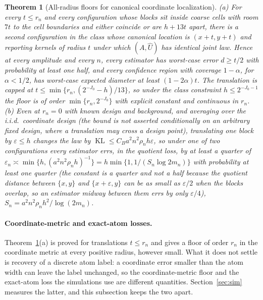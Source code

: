 \documentclass[11pt]{article}
\newtheorem{theorem}{Theorem}[section]
\theoremstyle{definition}
\newcommand{\1}{\mathbf 1}\newcommand{\op}{\operatorname}
\begin{document}
\begin{theorem}[All-radius floors for canonical coordinate localization]
\label{thm:floor}
\textup{(a)} For every $t\le r_n$ and every configuration whose blocks sit
inside coarse cells with room $7t$ to the cell boundaries and either coincide or
are $h+13t$ apart, there is a second configuration in the class whose canonical
location is $(x+t,y+t)$ and reporting kernels of radius $t$ under which
$(A,\widehat U)$ has \emph{identical} joint law.  Hence at every amplitude and
every $n$, every estimator has worst-case error $d\ge t/2$ with probability at
least one half, and every confidence region with coverage $1-\alpha$, for $\alpha<1/2$, has
worst-case expected diameter at least $(1-2\alpha)t$.  The translation is capped at $t\le\min\{r_n,(2^{-J_0}-h)/13\}$, so under the
class constraint $h\le2^{-J_0-1}$ the floor is of order $\min\{r_n,2^{-J_0}\}$
with explicit constant and continuous in $r_n$.
\textup{(b)} Even at $r_n=0$ with known design and background, and averaging
over the i.i.d.\ coordinate design (the bound is not asserted conditionally on
an arbitrary fixed design, where a translation may cross a design point),
translating one block by $\varepsilon\le h$ changes the law by
$\operatorname{KL}\le C_Ba^2n^2\rho_nh\varepsilon$, so under one of two configurations every estimator errs, in the quotient loss, by at least a quarter of
$\varepsilon_n\asymp\min\{h,(a^2n^2\rho_nh)^{-1}\}=h\min\{1,1/(S_n\log 2m_n)\}$
with probability at least one quarter (the constant is a quarter and not a half
because the quotient distance between $\{x,y\}$ and $\{x+\varepsilon,y\}$ can be
as small as $\varepsilon/2$ when the blocks overlap, so an estimator midway
between them errs by only $\varepsilon/4$), $S_n=a^2n^2\rho_nh^2/\log(2m_n)$.
\end{theorem}

\paragraph{Coordinate-metric and exact-atom losses.}
\label{sec:theory-floor}

Theorem~\ref{thm:floor}(a) is proved for translations $t\le r_n$ and gives a
floor of order $r_n$ in the coordinate metric at every positive radius,
however small.  What it does not settle is recovery of a discrete atom label:
a coordinate error smaller than the atom width can leave the label unchanged,
so the coordinate-metric floor and the exact-atom loss the simulations use
are different quantities.  Section~\ref{sec:sim} measures the latter, and
this subsection keeps the two apart.
\end{document}
